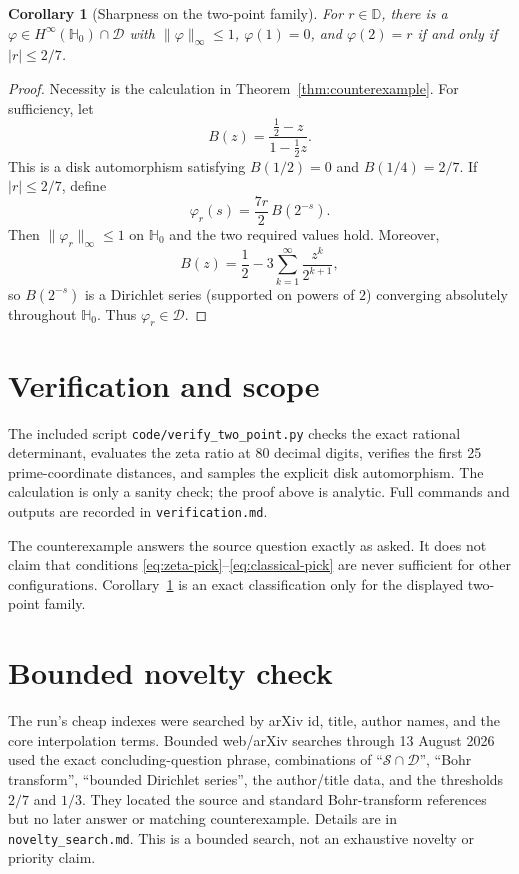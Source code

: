 \documentclass[11pt]{article}
\newtheorem{corollary}{Corollary}
\newcommand{\D}{\mathbb D}
\newcommand{\Hh}{\mathbb H}
\newcommand{\cD}{\mathcal D}
\begin{document}
\begin{corollary}[Sharpness on the two-point family]
\label{cor:sharp}
For $r\in\D$, there is a $\varphi\in H^\infty(\Hh_0)\cap\cD$ with
$\lVert\varphi\rVert_\infty\leq1$, $\varphi(1)=0$, and
$\varphi(2)=r$ if and only if $|r|\leq2/7$.
\end{corollary}

\begin{proof}
Necessity is the calculation in Theorem~\ref{thm:counterexample}.  For
sufficiency, let
\[
 B(z)=\frac{\frac12-z}{1-\frac12z}.
\]
This is a disk automorphism satisfying $B(1/2)=0$ and $B(1/4)=2/7$.  If
$|r|\leq2/7$, define
\[
 \varphi_r(s)=\frac{7r}{2}\,B(2^{-s}).
\]
Then $\lVert\varphi_r\rVert_\infty\leq1$ on $\Hh_0$ and the two required
values hold.  Moreover,
\[
 B(z)=\frac12-3\sum_{k=1}^{\infty}\frac{z^k}{2^{k+1}},
\]
so $B(2^{-s})$ is a Dirichlet series (supported on powers of $2$) converging
absolutely throughout $\Hh_0$.  Thus $\varphi_r\in\cD$.
\end{proof}

\section{Verification and scope}

The included script \texttt{code/verify\_two\_point.py} checks the exact
rational determinant, evaluates the zeta ratio at 80 decimal digits, verifies
the first 25 prime-coordinate distances, and samples the explicit disk
automorphism.  The calculation is only a sanity check; the proof above is
analytic.  Full commands and outputs are recorded in
\texttt{verification.md}.

The counterexample answers the source question exactly as asked.  It does not
claim that conditions \eqref{eq:zeta-pick}--\eqref{eq:classical-pick} are
never sufficient for other configurations.  Corollary~\ref{cor:sharp} is an
exact classification only for the displayed two-point family.

\section{Bounded novelty check}

The run's cheap indexes were searched by arXiv id, title, author names, and
the core interpolation terms.  Bounded web/arXiv searches through
13 August 2026 used the exact concluding-question phrase, combinations of
``$\mathcal S\cap\mathcal D$'', ``Bohr transform'', ``bounded Dirichlet
series'', the author/title data, and the thresholds $2/7$ and $1/3$.  They
located the source and standard Bohr-transform references but no later answer
or matching counterexample.  Details are in \texttt{novelty\_search.md}.
This is a bounded search, not an exhaustive novelty or priority claim.
\end{document}
